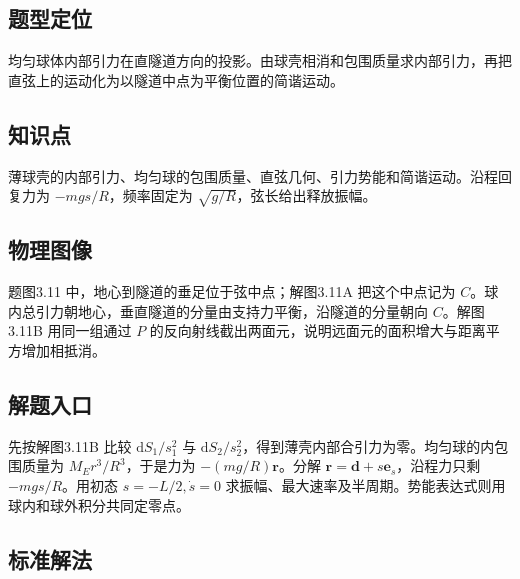 \documentclass[UTF8,fontset=fandol,a4paper,11pt]{ctexart}
\newcommand{\vect}[1]{\bm{#1}}
\begin{document}


\subsection*{题型定位}

均匀球体内部引力在直隧道方向的投影。由球壳相消和包围质量求内部引力，再把直弦上的运动化为以隧道中点为平衡位置的简谐运动。



\subsection*{知识点}

薄球壳的内部引力、均匀球的包围质量、直弦几何、引力势能和简谐运动。沿程回复力为 $-mgs/R$，频率固定为 $\sqrt{g/R}$，弦长给出释放振幅。




\subsection*{物理图像}

题图3.11 中，地心到隧道的垂足位于弦中点；解图3.11A 把这个中点记为 $C$。球内总引力朝地心，垂直隧道的分量由支持力平衡，沿隧道的分量朝向 $C$。解图3.11B 用同一组通过 $P$ 的反向射线截出两面元，说明远面元的面积增大与距离平方增加相抵消。



\subsection*{解题入口}

先按解图3.11B 比较 $\mathrm dS_1/s_1^2$ 与 $\mathrm dS_2/s_2^2$，得到薄壳内部合引力为零。均匀球的内包围质量为 $M_Er^3/R^3$，于是力为 $-(mg/R)\vect r$。分解 $\vect r=\vect d+s\vect e_s$，沿程力只剩 $-mgs/R$。用初态 $s=-L/2,\dot s=0$ 求振幅、最大速率及半周期。势能表达式则用球内和球外积分共同定零点。



\subsection*{标准解法}
\end{document}
